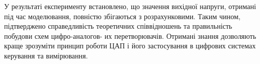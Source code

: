 \documentclass[12pt,a4paper]{article}
\begin{document}
    У результаті експерименту встановлено, що значення вихідної напруги, отримані під час моделювання, повністю збігаються з розрахунковими.  
    Таким чином, підтверджено справедливість теоретичних співвідношень та правильність побудови схем цифро-аналогов- их перетворювачів.  
    Отримані знання дозволяють краще зрозуміти принцип роботи ЦАП і його застосування в цифрових системах керування та вимірювання.
\end{document}
